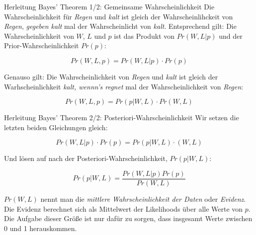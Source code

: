 \documentclass[
  ngerman,
  ignorenonframetext,
]{beamer}
\begin{document}
\begin{frame}{Herleitung Bayes' Theorem 1/2: Gemeinsame
Wahrscheinlichkeit}
\protect\hypertarget{herleitung-bayes-theorem-12-gemeinsame-wahrscheinlichkeit}{}
Die Wahrscheinlichkeit für \emph{Regen} und \emph{kalt} ist gleich der
Wahrscheinlihckeit von \emph{Regen}, \emph{gegeben kalt} mal der
Wahrscheinlicht von \emph{kalt}. Entsprechend gilt: Die
Wahrscheinlichkeit von \(W\), \(L\) und \(p\) ist das Produkt von
\(Pr(W,L|p)\) und der Prior-Wahrscheinlichkeit \(Pr(p)\):

\[Pr(W,L,p) = Pr(W,L|p) \cdot Pr(p)\]

Genauso gilt: Die Wahrscheinlichkeit von \emph{Regen} und \emph{kalt}
ist gleich der Warhscheinlichkeit \emph{kalt, wennn's regnet} mal der
Wahrscheinlichkeit von \emph{Regen}:

\[Pr(W,L,p) = Pr(p|W,L) \cdot Pr(W, L)\]
\end{frame}

\begin{frame}{Herleitung Bayes' Theorem 2/2:
Posteriori-Wahrscheinlichkeit}
\protect\hypertarget{herleitung-bayes-theorem-22-posteriori-wahrscheinlichkeit}{}
Wir setzen die letzten beiden Gleichungen gleich:

\[Pr(W,L|p) \cdot Pr(p) = Pr(p|W,L) \cdot (W,L)\]

Und lösen auf nach der Posteriori-Wahrscheinlichkeit, \(Pr(p|W,L)\):

\[Pr(p|W,L) = \frac{Pr(W,L|p) Pr(p)}{Pr(W,L)}\]

\(Pr(W,L)\) nennt man die \emph{mittlere Wahrscheinlichkeit der Daten}
oder \emph{Evidenz}. Die Evidenz berechnet sich als Mittelwert der
Likelihoods über alle Werte von \(p\). Die Aufgabe dieser Größe ist nur
dafür zu sorgen, dass insgesamt Werte zwischen 0 und 1 herauskommen.
\end{frame}
\end{document}
